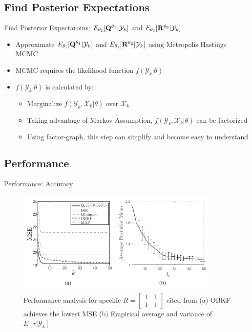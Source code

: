 \subsection{Find Posterior Expectations}
\begin{frame}{Find Posterior Expectatoins: $E_{\theta_1}[{\bf Q^{\theta_1}}|\mathcal{Y}_k]$ and $E_{\theta_1}[{\bf R^{\theta_2}}|\mathcal{Y}_k]$}
\begin{itemize}
    \item Approximate $E_{\theta_1}[{\bf Q^{\theta_1}}|\mathcal{Y}_k]$ and $E_{\theta_1}[{\bf R^{\theta_2}}|\mathcal{Y}_k]$ using Metropolis Hastings MCMC
    \item MCMC requires the likelihood function $f(\mathcal{Y}_k|\theta)$
    \item $f(\mathcal{Y}_k|\theta)$ is calculated by:
    \begin{itemize}
        \item Marginalize $f(\mathcal{Y}_k, \mathcal{X}_k|\theta)$ over $\mathcal{X}_k$
        \item Taking advantage of Markov Assumption, $f(\mathcal{Y}_k, \mathcal{X}_k|\theta)$ can be factorized
        \item Using factor-graph, this step can simplify and become easy to understand
    \end{itemize}
\end{itemize}
\end{frame}

\subsection{Performance}

\begin{frame}{Performance: Accuracy}
\begin{figure}[H]
    \begin{center}
    \includegraphics[width=10cm]{img/OBKF_r1.png}
    \caption{Performance analysis for specific $R=\begin{bmatrix} 1 & 1 \\ 1 & 1 \end{bmatrix}$ cited from \cite{Dehghannasiri2018} \protect\linebreak (a) OBKF achieves the lowest MSE \protect\linebreak (b) Empirical average and variance of $E[r|\mathcal{Y}_k]$ }
    \label{fig:r_1}
    \end{center}
\end{figure}
\end{frame}

